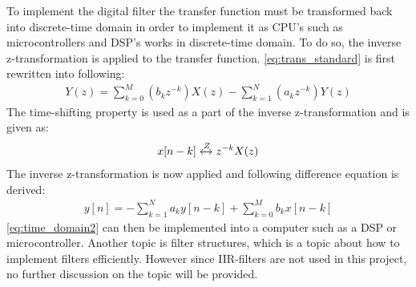 To implement the digital filter the transfer function must be transformed back into discrete-time domain in order to implement it as CPU's such as microcontrollers and DSP's works in discrete-time domain. To do so, the inverse z-transformation is applied to the transfer function. \autoref{eq:trans_standard} is first rewritten into following:
\begin{align}
Y(z) = \sum\limits_{k=0}^{M}(b_kz^{-k})X(z) -\sum\limits_{k=1}^{N}(a_kz^{-k})Y(z)
\label{eq:z_domain_trans}
\end{align}
The time-shifting property is used as a part of the inverse z-transformation and is given as:
\begin{align}
x[n-k] \xleftrightarrow{Z} z^{-k} X(z)
\label{eq:time_shifting}
\end{align}
The inverse z-transformation is now applied and following difference equation is derived:
\begin{align}
y[n] = -\sum\limits_{k=1}^{N}a_ky[n-k] + \sum\limits_{k=0}^{M}b_kx[n-k]
\label{eq:time_domain2}
\end{align}
\autoref{eq:time_domain2} can then be implemented into a computer such as a DSP or microcontroller. Another topic is filter structures, which is a topic about how to implement filters efficiently. However since IIR-filters are not used in this project, no further discussion on the topic will be provided.










